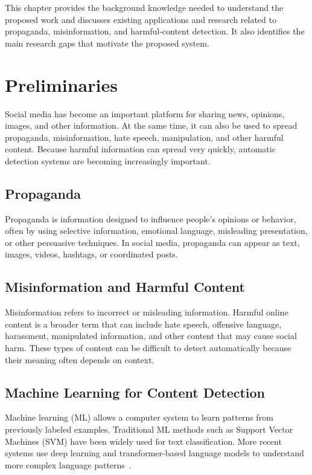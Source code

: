 \documentclass[12pt,a4paper]{report}
\begin{document}
This chapter provides the background knowledge needed to understand the proposed
work and discusses existing applications and research related to propaganda,
misinformation, and harmful-content detection. It also identifies the main research
gaps that motivate the proposed system.

\section{Preliminaries}
Social media has become an important platform for sharing news, opinions, images,
and other information. At the same time, it can also be used to spread propaganda,
misinformation, hate speech, manipulation, and other harmful content. Because
harmful information can spread very quickly, automatic detection systems are
becoming increasingly important.

\subsection{Propaganda}
Propaganda is information designed to influence people's opinions or behavior, often
by using selective information, emotional language, misleading presentation, or
other persuasive techniques. In social media, propaganda can appear as text,
images, videos, hashtags, or coordinated posts.

\subsection{Misinformation and Harmful Content}
Misinformation refers to incorrect or misleading information. Harmful online
content is a broader term that can include hate speech, offensive language,
harassment, manipulated information, and other content that may cause social harm.
These types of content can be difficult to detect automatically because their
meaning often depends on context.

\subsection{Machine Learning for Content Detection}
Machine learning (ML) allows a computer system to learn patterns from previously
labeled examples. Traditional ML methods such as Support Vector Machines (SVM) have
been widely used for text classification. More recent systems use deep learning and
transformer-based language models to understand more complex language
patterns~\cite{duridi2025,plikynas2025}.
\end{document}
